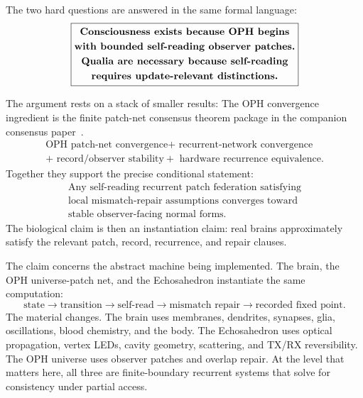 \documentclass[11pt]{article}
\theoremstyle{remark}
\theoremstyle{plain}
\begin{document}
The two hard questions are answered in the same formal language:
\[
\boxed{
\begin{gathered}
\text{\bfseries Consciousness exists because OPH begins}\\
\text{\bfseries with bounded self-reading observer patches.}\\
\text{\bfseries Qualia are necessary because self-reading}\\
\text{\bfseries requires update-relevant distinctions.}
\end{gathered}
}
\]

The argument rests on a stack of smaller results:
The OPH convergence ingredient is the finite patch-net consensus theorem package in the companion consensus paper~\cite{RealityAsConsensusProtocol}.
\[
\boxed{
\begin{gathered}
\text{OPH patch-net convergence}
+\text{ recurrent-network convergence}\\
+\text{ record/observer stability}
+\text{ hardware recurrence equivalence}.
\end{gathered}
}
\]
Together they support the precise conditional statement:
\[
\boxed{
\begin{gathered}
\text{Any self-reading recurrent patch federation satisfying}\\
\text{local mismatch-repair assumptions converges toward}\\
\text{stable observer-facing normal forms.}
\end{gathered}
}
\]
The biological claim is then an instantiation claim: real brains approximately satisfy the relevant patch, record, recurrence, and repair clauses.

The claim concerns the abstract machine being implemented. The brain, the OPH universe-patch net, and the Echosahedron instantiate the same computation:
\[
\boxed{
\text{state}
\longrightarrow
\text{transition}
\longrightarrow
\text{self-read}
\longrightarrow
\text{mismatch repair}
\longrightarrow
\text{recorded fixed point}.
}
\]
The material changes. The brain uses membranes, dendrites, synapses, glia, oscillations, blood chemistry, and the body. The Echosahedron uses optical propagation, vertex LEDs, cavity geometry, scattering, and TX/RX reversibility. The OPH universe uses observer patches and overlap repair. At the level that matters here, all three are finite-boundary recurrent systems that solve for consistency under partial access.
\end{document}
